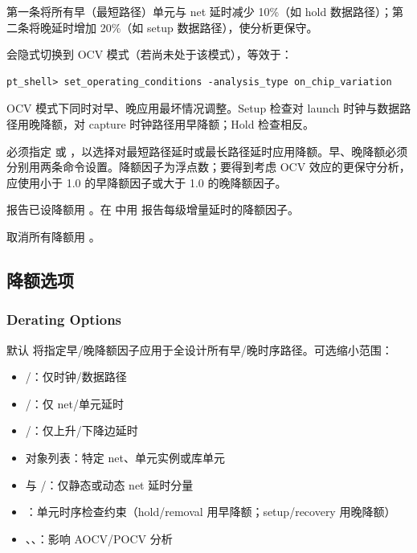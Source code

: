 第一条将所有早（最短路径）单元与 net 延时减少 10\%（如 hold 数据路径）；第二条将晚延时增加 20\%（如 setup 数据路径），使分析更保守。

 会隐式切换到 OCV 模式（若尚未处于该模式），等效于：
\begin{lstlisting}
pt_shell> set_operating_conditions -analysis_type on_chip_variation
\end{lstlisting}

OCV 模式下同时对早、晚应用最坏情况调整。Setup 检查对 launch 时钟与数据路径用晚降额，对 capture 时钟路径用早降额；Hold 检查相反。

必须指定  或 ，以选择对最短路径延时或最长路径延时应用降额。早、晚降额必须分别用两条命令设置。降额因子为浮点数；要得到考虑 OCV 效应的更保守分析，应使用小于 1.0 的早降额因子或大于 1.0 的晚降额因子。

报告已设降额用 。在  中用  报告每级增量延时的降额因子。

取消所有降额用 。

\subsection{降额选项}
\subsubsection*{Derating Options}

默认  将指定早/晚降额因子应用于全设计所有早/晚时序路径。可选缩小范围：
\begin{itemize}
  \item {}/：仅时钟/数据路径
  \item {}/：仅 net/单元延时
  \item {}/：仅上升/下降边延时
  \item 对象列表：特定 net、单元实例或库单元
  \item {} 与 /：仅静态或动态 net 延时分量
  \item {}：单元时序检查约束（hold/removal 用早降额；setup/recovery 用晚降额）
  \item {}、、：影响 AOCV/POCV 分析
\end{itemize}

